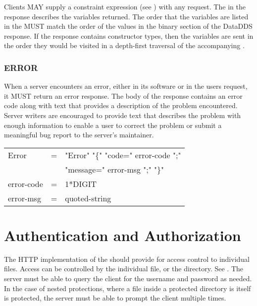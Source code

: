\documentclass[justify]{dods-paper}
\begin{document}
Clients MAY supply a constraint expression (see \DAPObjects) with
any  request. The \DDS in the  response
describes the variables returned. The order that the variables are listed in
the \DDS MUST match the order of the values in the binary section of the
\ac{DataDDS} response. If the response contains constructor types, then the
variables are sent in the order they would be visited in a depth-first
traversal of the accompanying \DDS.

\subsubsection{ERROR}
\label{sec-error}
When a server encounters an error, either in its software or in the users
request, it MUST return an error response. The body of the response contains
an error code along with text that provides a description of the problem
encountered. Server writers are encouraged to provide text that describes the
problem with enough information to enable a user to correct the problem or
submit a meaningful bug report to the server's maintainer.


\begin{ttfamily}
\begin{center}
\begin{tabular}{lll}
Error & = & "Error" "\{" "code=" error-code ";" \\
      & & "message=" error-msg ";" "\}" \\
error-code & = & 1*DIGIT \\
error-msg & = & quoted-string \\
\end{tabular}
\end{center}
\end{ttfamily}

\section{Authentication and Authorization}

The HTTP implementation of the \DAP should provide for access control to
individual files.  Access can be controlled by the individual file, or
the directory.  See .  The \DAP server must
be able to query the client for the username and password as needed.
In the case of nested protections, where a file inside a protected
directory is itself is protected, the \DAP server must be able to
prompt the client multiple times.
\end{document}
